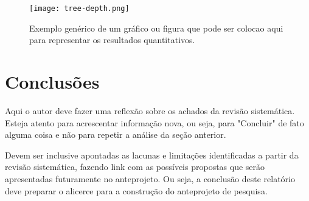 \documentclass[12pt]{article}
\begin{document}
\begin{figure}[tb]
    \centering
    \texttt{[image: tree-depth.png]}
    \caption{Exemplo genérico de um gráfico ou figura que pode ser colocao aqui para representar os resultados quantitativos.}
    \label{fig:depth}
\end{figure}

\section{Conclusões}

Aqui o autor deve fazer uma reflexão sobre os achados da revisão sistemática. Esteja atento para acrescentar informação nova, ou seja, para "Concluir" de fato alguma coisa e não para repetir a análise da seção anterior. 

Devem ser inclusive apontadas as lacunas e limitações identificadas a partir da revisão sistemática, fazendo link com as possíveis propostas que serão apresentadas futuramente no anteprojeto. Ou seja, a conclusão deste relatório deve preparar o alicerce para a construção do anteprojeto de pesquisa. 





\end{document}
